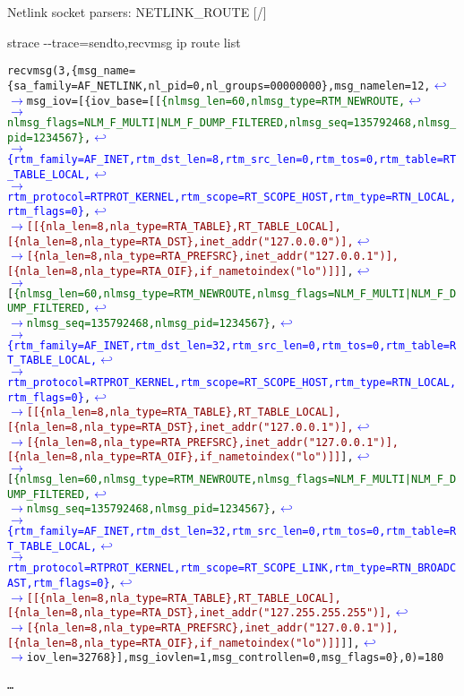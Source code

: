 \documentclass[unicode,aspectratio=169,xcolor={table,dvipsnames,usernames}]{beamer}
\newcommand{\symlinebreak}{\textcolor{blue}{\(\hookleftarrow\)}}
\newcommand{\symlinecont}{\textcolor{blue}{\(\longrightarrow\)}}
\begin{document}
\begin{frame}[fragile]{Netlink socket parsers: NETLINK\_ROUTE \hfill [\insertframenumber/\inserttotalframenumber]}
\begin{block}{\large strace -{}-trace=sendto,recvmsg ip route list}
\begin{alltt}
recvmsg(3, \{msg_name=\{sa_family=AF_NETLINK, nl_pid=0, nl_groups=00000000\}, msg_namelen=12, \symlinebreak
\symlinecont msg_iov=[\{iov_base=[[\textcolor{darkgreen}{\{nlmsg_len=60, nlmsg_type=RTM_NEWROUTE, \symlinebreak
\symlinecont nlmsg_flags=NLM_F_MULTI|NLM_F_DUMP_FILTERED, nlmsg_seq=135792468, nlmsg_pid=1234567\}}, \symlinebreak
\symlinecont \textcolor{blue}{\{rtm_family=AF_INET, rtm_dst_len=8, rtm_src_len=0, rtm_tos=0, rtm_table=RT_TABLE_LOCAL, \symlinebreak
\symlinecont rtm_protocol=RTPROT_KERNEL, rtm_scope=RT_SCOPE_HOST, rtm_type=RTN_LOCAL, rtm_flags=0\}}, \symlinebreak
\symlinecont \textcolor{darkred}{[[\{nla_len=8, nla_type=RTA_TABLE\}, RT_TABLE_LOCAL], [\{nla_len=8, nla_type=RTA_DST\}, inet_addr("127.0.0.0")], \symlinebreak
\symlinecont [\{nla_len=8, nla_type=RTA_PREFSRC\}, inet_addr("127.0.0.1")], [\{nla_len=8, nla_type=RTA_OIF\}, if_nametoindex("lo")]]}], \symlinebreak
\symlinecont [\textcolor{darkgreen}{\{nlmsg_len=60, nlmsg_type=RTM_NEWROUTE, nlmsg_flags=NLM_F_MULTI|NLM_F_DUMP_FILTERED, \symlinebreak
\symlinecont nlmsg_seq=135792468, nlmsg_pid=1234567\}}, \symlinebreak
\symlinecont \textcolor{blue}{\{rtm_family=AF_INET, rtm_dst_len=32, rtm_src_len=0, rtm_tos=0, rtm_table=RT_TABLE_LOCAL, \symlinebreak
\symlinecont rtm_protocol=RTPROT_KERNEL, rtm_scope=RT_SCOPE_HOST, rtm_type=RTN_LOCAL, rtm_flags=0\}}, \symlinebreak
\symlinecont \textcolor{darkred}{[[\{nla_len=8, nla_type=RTA_TABLE\}, RT_TABLE_LOCAL], [\{nla_len=8, nla_type=RTA_DST\}, inet_addr("127.0.0.1")], \symlinebreak
\symlinecont [\{nla_len=8, nla_type=RTA_PREFSRC\}, inet_addr("127.0.0.1")], [\{nla_len=8, nla_type=RTA_OIF\}, if_nametoindex("lo")]]}], \symlinebreak
\symlinecont [\textcolor{darkgreen}{\{nlmsg_len=60, nlmsg_type=RTM_NEWROUTE, nlmsg_flags=NLM_F_MULTI|NLM_F_DUMP_FILTERED, \symlinebreak
\symlinecont nlmsg_seq=135792468, nlmsg_pid=1234567\}}, \symlinebreak
\symlinecont \textcolor{blue}{\{rtm_family=AF_INET, rtm_dst_len=32, rtm_src_len=0, rtm_tos=0, rtm_table=RT_TABLE_LOCAL, \symlinebreak
\symlinecont rtm_protocol=RTPROT_KERNEL, rtm_scope=RT_SCOPE_LINK, rtm_type=RTN_BROADCAST, rtm_flags=0\}}, \symlinebreak
\symlinecont \textcolor{darkred}{[[\{nla_len=8, nla_type=RTA_TABLE\}, RT_TABLE_LOCAL], [\{nla_len=8, nla_type=RTA_DST\}, inet_addr("127.255.255.255")], \symlinebreak
\symlinecont [\{nla_len=8, nla_type=RTA_PREFSRC\}, inet_addr("127.0.0.1")], [\{nla_len=8, nla_type=RTA_OIF\}, if_nametoindex("lo")]]}]], \symlinebreak
\symlinecont iov_len=32768\}], msg_iovlen=1, msg_controllen=0, msg_flags=0\}, 0) = 180

\ldots
\end{alltt}
\end{block}
\end{frame}
\end{document}
